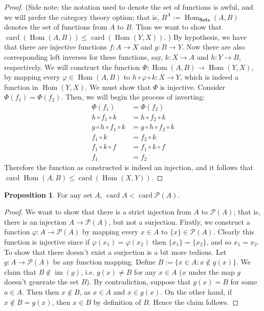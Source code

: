 \documentclass[9pt,reqno]{amsart}
\theoremstyle{definition}
\newtheorem{prop}{Proposition}[section]
\DeclareMathOperator{\im}{im}
\DeclareMathOperator{\Hom}{Hom}
\DeclareMathOperator{\card}{card}
\begin{document}
\begin{proof}
	(Side note: the notation used to denote the set of functions is awful, and we will prefer the category theory option; that is, $B^A := \Hom _{\mathbf{Sets}} (A, B)$ denotes the set of functions from $A$ to $B$. Thus we want to show that $\card ( \Hom (A,B) ) \leq  \card (\Hom (Y,X))$. ) By hypothesis, we have that there are injective functions $f \colon A \to X$ and $g \colon B \to Y$. Now there are also corresponding left inverses for these functions, say, $k \colon X \to A$ and $h \colon Y \to B$, respectively. We will construct the function $\Phi \colon \Hom (A, B) \to \Hom (Y,X)$, by mapping every $\varphi \in \Hom (A,B)$ to $ h \circ \varphi \circ k \colon X\to Y$, which is indeed a function in $\Hom (Y,X)$. We must show that $\Phi$ is injective. Consider $\Phi (f_1) = \Phi (f_2)$. Then, we will begin the process of inverting: 
	\begin{align*}	
		\Phi (f_1) &= \Phi (f_2) \\
		h \circ f_1 \circ k &= h \circ f_2 \circ k \\
		g \circ h \circ  f_1 \circ k &= g \circ h \circ f_2 \circ k \\
		f_1 \circ k &=  f_2 \circ k \\
		f_1 \circ k \circ f &= f_1 \circ k \circ f \\ 
		f_1 & = f_2
	\end{align*}
	Therefore the function as constructed is indeed an injection, and it follows that $\card \Hom (A, B) \leq \card (\Hom (X, Y))$.
\end{proof}
\begin{prop}
For any set $A$, $\card A < \card \mathcal P (A)$.	
\end{prop}
\begin{proof}
	We want to show that there is a strict injection from $A$ to $\mathcal P(A)$; that is, there is an injection $A \to \mathcal P(A)$, but not a surjection. Firstly, we construct a function $\varphi \colon A \to \mathcal P(A)$ by mapping every $x \in A$ to $\{x \} \in \mathcal P(A)$. Clearly this function is injective since if $\varphi(x_1) = \varphi(x_2)$ then $\{x_1 \} = \{x_2 \}$, and so $x_1 = x_2$. To show that there doesn't exist a surjection is a bit more tedious. Let $g \colon A \to \mathcal P(A)$ be any function mapping. Define $B := \{x \in A \colon x \notin g (x) \}$. We claim that $B \notin \im (g)$, i.e. $g(x) \neq B$ for any $x \in A$ ($x$ under the map $g$ doesn't generate the set $B$). By contradiction, suppose that $g(x) = B$ for some $a \in A$. Then then $x \notin B$, as $x \in A$ and $x \in g(x)$. On the other hand, if $x \notin B = g(x)$, then $x \in B$ by definition of $B$. Hence the claim follows. 
\end{proof}
\end{document}
